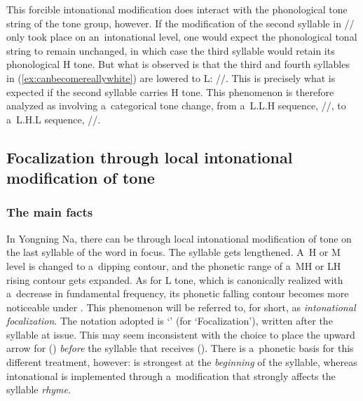 This forcible intonational modification does interact with the phonological tone string of the tone
group, however. If the modification of the second syllable in // only took
place on an~intonational level, one would expect the phonological tonal string to remain unchanged, in
which case the third syllable would retain its phonological H tone. But what is observed is that the
third and fourth syllables in (\ref{ex:canbecomereallywhite}) are lowered to L:
//. This is precisely what is expected if the second syllable carries H tone. This
phenomenon is therefore analyzed as involving a~categorical tone change, from a~L.L.H sequence, //, to a~L.H.L sequence, //.


\subsection[Focalization by intonational means]{Focalization through local intonational modification of tone}
\label{sec:focalization}


\subsubsection{The main facts}
\label{sec:themainfactsfocalization}

In Yongning Na, there can be  through local intonational modification of tone on the last syllable of the word in focus. The syllable gets lengthened. A~H or M level is changed to
a~dipping {contour}, and the phonetic range of a~MH or LH rising {contour} gets expanded. As for L tone, which is canonically realized with a~decrease in fundamental frequency, its phonetic falling {contour} becomes more noticeable under . This phenomenon will be referred to, for short, as \textit{intonational focalization}. The notation
adopted is ‘’ (for ‘Focalization’), written after the syllable at issue. This may seem inconsistent
with the choice to place the upward arrow for  () \textit{before} the syllable that
receives  (). There is a~phonetic basis for this different treatment, however:  is strongest at the \textit{beginning} of
the syllable, whereas intonational  is implemented through a~modification that strongly
affects the syllable \textit{rhyme}.

